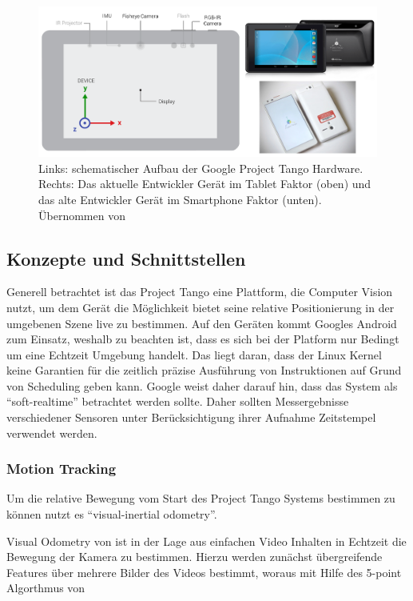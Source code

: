 \begin{figure}[h]
  \centering
	\includegraphics[width=1.0\textwidth]{content/images/theory/tango-device.png} 
  \caption{Links: schematischer Aufbau der Google Project Tango Hardware. Rechts: Das aktuelle Entwickler Gerät im Tablet Faktor (oben) und das alte Entwickler Gerät im Smartphone Faktor (unten). Übernommen von \citet{GoogleDevelopers:online}}
  \label{fig:tango-device}
\end{figure}

\subsection{Konzepte und Schnittstellen}

Generell betrachtet ist das Project Tango eine Plattform, die Computer Vision nutzt, um dem Gerät die Möglichkeit bietet seine relative Positionierung in der umgebenen Szene live zu bestimmen. Auf den Geräten kommt Googles Android zum Einsatz, weshalb zu beachten ist, dass es sich bei der Platform nur Bedingt um eine Echtzeit Umgebung handelt. Das liegt daran, dass der Linux Kernel keine Garantien für die zeitlich präzise Ausführung von Instruktionen  auf Grund von Scheduling geben kann. Google weist daher darauf hin, dass das System als \enquote{soft-realtime} betrachtet werden sollte. Daher sollten Messergebnisse verschiedener Sensoren unter Berücksichtigung ihrer Aufnahme Zeitstempel verwendet werden. \citet{GoogleDevelopersConcepts:online}

\subsubsection{Motion Tracking}

Um die relative Bewegung vom Start des Project Tango Systems bestimmen zu können nutzt es \enquote{visual-inertial odometry}. 

Visual Odometry von \citet{nister2004visual} ist in der Lage aus einfachen Video Inhalten in Echtzeit die Bewegung der Kamera zu bestimmen. Hierzu werden zunächst übergreifende Features über mehrere Bilder des Videos bestimmt, woraus mit Hilfe des 5-point Algorthmus von 

